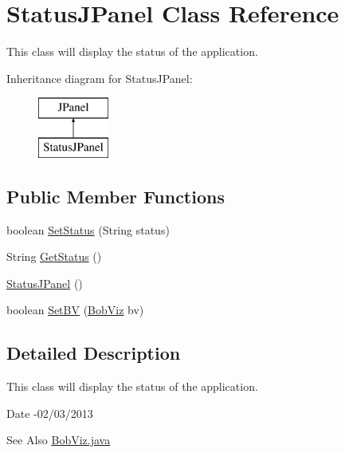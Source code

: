 \hypertarget{class_status_j_panel}{\section{Status\-J\-Panel Class Reference}
\label{class_status_j_panel}
}


This class will display the status of the application.  


Inheritance diagram for Status\-J\-Panel\-:\begin{figure}[H]
\begin{center}
\leavevmode
\includegraphics[height=2.000000cm]{class_status_j_panel}
\end{center}
\end{figure}
\subsection*{Public Member Functions}
\begin{DoxyCompactItemize}
\item 
boolean \hyperlink{class_status_j_panel_ac601eae1536e1a412c71f383cd116610}{Set\-Status} (String status)
\item 
String \hyperlink{class_status_j_panel_afea138c52207657b5b3b555ce1a70e42}{Get\-Status} ()
\item 
\hyperlink{class_status_j_panel_a2ec0b292761d595f99ac7293398ae97a}{Status\-J\-Panel} ()
\item 
boolean \hyperlink{class_status_j_panel_a80d2f3a1eba1516b449115fb8464cfac}{Set\-B\-V} (\hyperlink{class_bob_viz}{Bob\-Viz} bv)
\end{DoxyCompactItemize}


\subsection{Detailed Description}
This class will display the status of the application. 

\begin{DoxyDate}{Date}
-\/02/03/2013 
\end{DoxyDate}
\begin{DoxySeeAlso}{See Also}
\hyperlink{_bob_viz_8java}{Bob\-Viz.\-java} 
\end{DoxySeeAlso}


